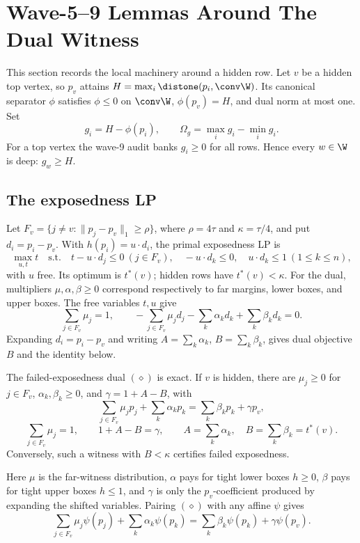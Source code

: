 \section{Wave-5--9 Lemmas Around The Dual Witness}
This section records the local machinery around a hidden row.  Let \(v\) be a hidden top
vertex, so \(p_v\) attains \(H=\max_i\distone(p_i,\conv\W)\).  Its canonical separator
\(\phi\) satisfies \(\phi\le0\) on \(\conv\W\), \(\phi(p_v)=H\), and dual norm at most one.
Set
\[
  g_i=H-\phi(p_i),\qquad \Omega_g=\max_i g_i-\min_i g_i .
\]
For a top vertex the wave-9 audit banks \(g_i\ge0\) for all rows.  Hence every \(w\in\W\)
is deep: \(g_w\ge H\).
\subsection{The exposedness LP}
Let \(F_v=\{j\ne v:\|p_j-p_v\|_1\ge\rho\}\), where \(\rho=4\tau\) and \(\kappa=\tau/4\), and
put \(d_i=p_i-p_v\).  With \(h(p_i)=u\cdot d_i\), the primal exposedness LP is
\[
  \max_{u,t}t\quad\text{s.t.}\quad
  t-u\cdot d_j\le0\ (j\in F_v),\quad -u\cdot d_k\le0,\quad u\cdot d_k\le1\ (1\le k\le n),
\]
with \(u\) free.  Its optimum is \(t^*(v)\); hidden rows have \(t^*(v)<\kappa\).
For the dual, multipliers \(\mu,\alpha,\beta\ge0\) correspond respectively to far margins,
lower boxes, and upper boxes.  The free variables \(t,u\) give
\[
  \sum_{j\in F_v}\mu_j=1,\qquad
  -\sum_{j\in F_v}\mu_jd_j-\sum_k\alpha_kd_k+\sum_k\beta_kd_k=0 .
\]
Expanding \(d_i=p_i-p_v\) and writing \(A=\sum_k\alpha_k\), \(B=\sum_k\beta_k\), gives dual
objective \(B\) and the identity below.
\begin{lemma}
\provedbadge\label{lem:diamond-dual}
The failed-exposedness dual \((\diamond)\) is exact.  If \(v\) is hidden, there are
\(\mu_j\ge0\) for \(j\in F_v\), \(\alpha_k,\beta_k\ge0\), and \(\gamma=1+A-B\), with
\[
  \sum_{j\in F_v}\mu_jp_j+\sum_k\alpha_kp_k=\sum_k\beta_kp_k+\gamma p_v,      \tag{\(\diamond\)}
\]
\[
  \sum_{j\in F_v}\mu_j=1,\qquad 1+A-B=\gamma,\qquad
  A=\sum_k\alpha_k,\quad B=\sum_k\beta_k=t^*(v).
\]
Conversely, such a witness with \(B<\kappa\) certifies failed exposedness.
\end{lemma}
\noindent Here \(\mu\) is the far-witness distribution, \(\alpha\) pays for tight lower
boxes \(h\ge0\), \(\beta\) pays for tight upper boxes \(h\le1\), and \(\gamma\) is only the
\(p_v\)-coefficient produced by expanding the shifted variables.
Pairing \((\diamond)\) with any affine \(\psi\) gives
\[
  \sum_{j\in F_v}\mu_j\psi(p_j)+\sum_k\alpha_k\psi(p_k)
  =\sum_k\beta_k\psi(p_k)+\gamma\psi(p_v).
\]
